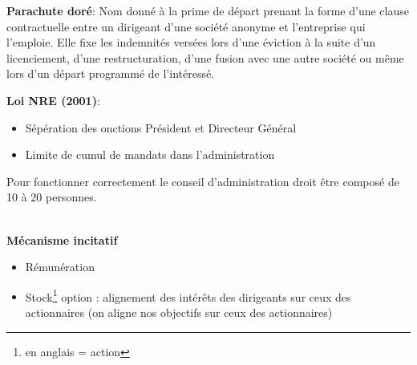 \begin{definition}
	\textbf{Parachute doré}: Nom donné à la prime de départ prenant la forme d’une clause contractuelle entre un dirigeant d’une société anonyme et l’entreprise qui l’emploie. Elle fixe
	les indemnités versées lors d’une éviction à la suite d’un licenciement, d’une restructuration, d’une fusion avec une autre société ou même lors d’un départ
	programmé de l’intéressé.
\end{definition}

\begin{definition}
	\textbf{Loi NRE (2001)}: 
	\begin{itemize}
		\item Sépération des onctions Président et Directeur Général
		\item Limite de cumul de mandats dans l'administration
	\end{itemize}
\end{definition}

\begin{remarque}
Pour fonctionner correctement le conseil d’administration droit être composé de  10 à 20 personnes.\\~
\end{remarque}

\textbf{Mécanisme incitatif}
\begin{itemize}
	\item Rémunération
	\item Stock\footnote{en anglais = action} option : alignement des intérêts des dirigeants sur ceux des actionnaires (on aligne nos objectifs sur ceux des actionnaires)
\end{itemize}

